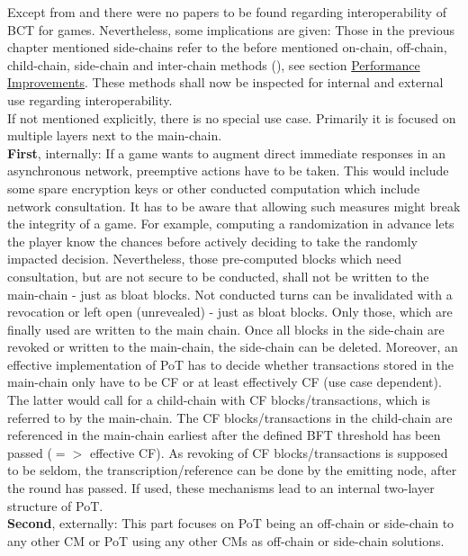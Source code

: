 Except from \citet{Besancon.2019} and \citet{Kraft.2016} there were no papers to be found regarding interoperability of \gls{BCT} for games.
Nevertheless, some implications are given:
Those in the previous chapter mentioned side-chains refer to the before mentioned on-chain, off-chain, child-chain, side-chain and inter-chain methods (\citet{Kim.2018}), see section \hyperref[sec:PerformanceImprovements]{Performance Improvements}.
These methods shall now be inspected for internal and external use regarding interoperability. \\
If not mentioned explicitly, there is no special use case.
Primarily it is focused on multiple layers next to the main-chain. \\
\textbf{First}, internally: If a game wants to augment direct immediate responses in an asynchronous network, preemptive actions have to be taken.
This would include some spare encryption keys or other conducted computation which include network consultation.
It has to be aware that allowing such measures might break the integrity of a game.
For example, computing a randomization in advance lets the player know the chances before actively deciding to take the randomly impacted decision.
Nevertheless, those pre-computed blocks which need consultation, but are not secure to be conducted, shall not be written to the main-chain - just as bloat blocks.
Not conducted turns can be invalidated with a revocation or left open (unrevealed) - just as bloat blocks.
Only those, which are finally used are written to the main chain.
Once all blocks in the side-chain are revoked or written to the main-chain, the side-chain can be deleted.
Moreover, an effective implementation of \gls{PoT} has to decide whether transactions stored in the main-chain only have to be \gls{CF} or at least effectively \gls{CF} (use case dependent).
The latter would call for a child-chain with \gls{CF} blocks/transactions, which is referred to by the main-chain.
The \gls{CF} blocks/transactions in the child-chain are referenced in the main-chain earliest after the defined \gls{BFT} threshold has been passed ($=>$ effective \gls{CF}).
As revoking of \gls{CF} blocks/transactions is supposed to be seldom, the transcription/reference can be done by the emitting node, after the round has passed.
If used, these mechanisms lead to an internal two-layer structure of \gls{PoT}.\\
\textbf{Second}, externally:
This part focuses on \gls{PoT} being an off-chain or side-chain to any other \gls{CM} or \gls{PoT} using any other \gls{CM}s as off-chain or side-chain solutions.
